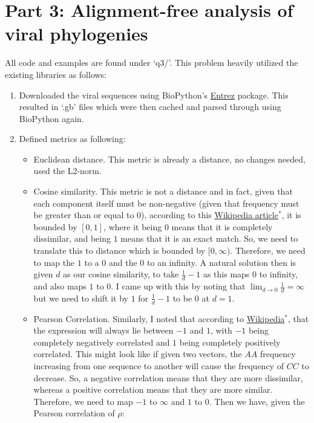 \documentclass[10pt]{article}
\begin{document}
\section*{Part 3: Alignment-free analysis of viral phylogenies}
All code and examples are found under `q3/'. This problem heavily utilized the existing libraries as follows:
\begin{enumerate}
  \item Downloaded the viral sequences using BioPython's \href{https://biopython.org/docs/1.76/api/Bio.Entrez.html#Bio.Entrez.efetch}{Entrez} package. This resulted in `.gb' files which were then cached and parsed through using BioPython again.
  \item Defined metrics as following:
  \begin{itemize}
    \item Euclidean distance. This metric is already a distance, no changes needed, used the L2-norm.
    \item Cosine similarity. This metric is not a distance and in fact, given that each component itself must be non-negative (given that frequency must be greater than or equal to 0), according to this \href{https://en.wikipedia.org/wiki/Cosine_similarity}{Wikipedia article$^*$}, it is bounded by $[0, 1]$, where it being $0$ means that it is completely dissimilar, and being $1$ means that it is an exact match. So, we need to translate this to distance which is bounded by $[0, \infty)$. Therefore, we need to map the $1$ to a $0$ and the $0$ to an infinity. A natural solution then is given $d$ as our cosine similarity, to take $\frac{1}{d} - 1$ as this maps $0$ to infinity, and also maps $1$ to $0$. I came up with this by noting that $\lim_{d \rightarrow 0}\frac{1}{d} = \infty$ but we need to shift it by $1$ for $\frac{1}{d} - 1$ to be $0$ at $d = 1$.
    \item Pearson Correlation. Similarly, I noted that according to \href{https://en.wikipedia.org/wiki/Pearson_correlation_coefficient}{Wikipedia$^*$}, that the expression will always lie between $-1$ and $1$, with $-1$ being completely negatively correlated and $1$ being completely positively correlated. This might look like if given two vectors, the $AA$ frequency increasing from one sequence to another will cause the frequency of $CC$ to decrease. So, a negative correlation means that they are more dissimilar, whereas a positive correlation means that they are more similar. Therefore, we need to map $-1$ to $\infty$ and $1$ to $0$. Then we have, given the Pearson correlation of $\rho$:
    

\end{itemize}
\end{enumerate}
\end{document}
